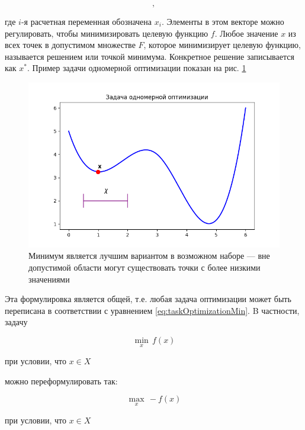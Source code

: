 \begin{equation}
    [x_1,x_2,...,x_n],
	\label{eq:arrayX}
\end{equation}

где $i$-я расчетная переменная обозначена $x_i$. Элементы в этом векторе можно регулировать, чтобы минимизировать целевую функцию $f$. Любое значение $x$ из всех точек в допустимом множестве $F$, которое минимизирует целевую функцию, называется решением или точкой минимума. Конкретное решение записывается как $x^*$. Пример задачи одномерной оптимизации показан на рис. \ref{fig:figure_1}

\begin{figure}[ht]
 \centering
		\includegraphics[height =7 cm, keepaspectratio]{../assets/images/Figure_1.png}
		\caption{Минимум является лучшим вариантом в возможном наборе —
вне допустимой области могут существовать точки с более низкими значениями
}
\label{fig:figure_1}
	\end{figure}

Эта формулировка является общей, т.е. любая задача оптимизации может быть переписана в соответствии с уравнением \eqref{eq:taskOptimizationMin}. B частности, задачу

\begin{equation}
  \min_{x} \, f(x) 
\end{equation}

\begin{center}
при условии, что $x \in X$
\end{center}

можно переформулировать так:

\begin{equation}
  \max_{x} \, -f(x) 
  \label{eq:TaskOptimizationMax}
\end{equation}

 \begin{center}
 при условии, что $x \in X$
 \end{center}
 
